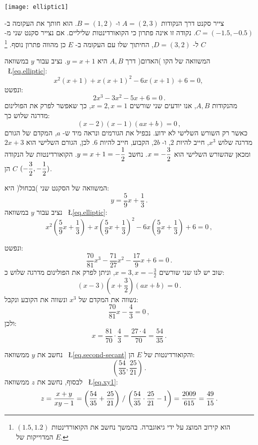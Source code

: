 \np

\begin{center}
\texttt{[image: elliptic1]}
\end{center}


צייר סקנט דרך הנקודות
$A=(2,3)$
ו-%
$B=(1,2)$.
הוא חותך את העקומה ב-%
$C=(-1.5,-0.5)$.
נקודה זו אינה פתרון כי הקואורדינטות שליליים. אם נצייר סקנט שני מ-%
$C$
ל-%
$D=(3,2)$,
החיתוך שלו עם העקומה ב-%
$E$
כן מהווה פתרון נוסף.%
\footnote{$(1.5,1.2)$
הוא קירוב המוצג על ידי גיאוגברה. בהמשך נחשב את הקואורדינטות המדוייקות של
$E$.}

המשוואה של הקו )האדום( דרך 
$A,B$
היא
$y=x+1$. 
נציב עבור 
$y$
במשוואה%
~\L{\ref{eq.elliptic}}:
\[
x^2(x+1) + x(x+1)^2 -6x(x+1) +6 =0,\,
\]
ונפשט:
\[
2x^3 -3x^2 -5x +6 =0\,.
\]
מהנקודות
$A,B$,
אנו יודעים שני שורשים
$x=2,x=1$,
כך שאפשר לפרק את הפולינום מדרגה שלוש כך:
\[
(x-2)(x-1)(ax+b)=0\,,
\]
כאשר רק השורש השלישי לא ידוע. נכפיל את הגורמים ונראה מיד ש-%
$a$,
המקדם של הגורם מדרגה שלוש
$x^3$,
חייב להיות
$2$,
ו-%
$2b$,
הקבוע, חייב להיות
$6$.
לכן, הגורם השלישי הוא
$2x+3$
ומכאן שהשורש השלישי הוא
$x=-\displaystyle\frac{3}{2}$.
נחשב
$y=x+1=-\displaystyle\frac{1}{2}$.
הקואורדינטות של הנקודה
$C$
הן
$(-\displaystyle\frac{3}{2},-\displaystyle\frac{1}{2})$.

המשוואה של הסקנט שני )בכחול( היא:
\begin{equation}
y = \frac{5}{9}x + \frac{1}{3}\,.\label{eq.second-secant}
\end{equation}
נציב עבור 
$y$
במשוואה 
~\L{\ref{eq.elliptic}}:
\[
x^2\left(\frac{5}{9}x + \frac{1}{3}\right) + x\left(\frac{5}{9}x + \frac{1}{3}\right)^2 -6x\left(\frac{5}{9}x + \frac{1}{3}\right) +6 =0\,,
\]

\np

ונפשט:
\[
\frac{70}{81}x^3 - \frac{71}{27}x^2 - \frac{17}{9}x +6 =0\,.
\]
שוב יש לנו שני שורשים
$x=3,x=-\frac{3}{2}$,
וניתן לפרק את הפולינום מדרגה שלוש כ:
\[
(x-3)(x+\frac{3}{2})(ax+b)=0\,.
\]
נשווה את המקדם של 
$x^3$
ונשווה את הקובע ונקבל:
\[
\frac{70}{81}x - \frac{4}{3}=0\,,
\]
ולכן:
\[
x=\frac{81}{70}\cdot \frac{4}{3}= \frac{27\cdot 4}{70} = \frac{54}{35}\,.
\]

נחשב את
$y$
ממשוואה
~\L{\ref{eq.second-secant}}
והקואורדינטות של
$E$
הן:
\[
\left(\frac{54}{35}, \frac{25}{21}\right)\,.
\]
לבסוף, נחשב את
$z$
ממשוואה
~\L{\ref{eq.xy1}}:
\[
z=\frac{x+y}{xy-1}=%
\left(\disfrac{54}{35} + \disfrac{25}{21}\right)%
 \, / \,%
\left(\disfrac{54}{35}\cdot\disfrac{25}{21}-1\right)=%
\frac{2009}{615} = \frac{49}{15}\,.
\]

